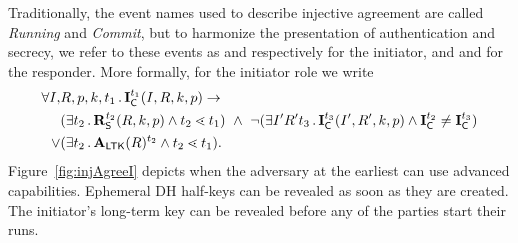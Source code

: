 Traditionally, the event names used to describe injective agreement are called
\emph{Running} and \emph{Commit}, but to harmonize the presentation of
authentication and secrecy, we refer to these events as \mIStart{} and
\mIComplete{} respectively for the initiator, and \mRStart{} and \mRComplete{}
for the responder.
%
More formally, for the initiator role we write
\begin{align*}
    \forall I,& R, p, k, t_1\mLogicDot \mIComplete^{t_1}(I, R, k, p)
    \rightarrow\\
    &(\exists t_2\mLogicDot \mRStart^{t_2}(R, k, p) \land t_2 \lessdot t_1)\ 
    \land\ \neg(\exists I' R' t_3 \mLogicDot \mIComplete^{t_3}(I' , R', k, p)
        \land \mIComplete^{t_2} \not = \mIComplete^{t_3}) \\
    \lor&(\exists t_2\mLogicDot \mRevLTK{R}^{t_2} \land t_2 \lessdot t_1).
\end{align*}
%
Figure~\ref{fig:injAgreeI} depicts when the adversary at the earliest can use
advanced capabilities.
%
Ephemeral DH half-keys can be revealed as soon as they are created.
%
The initiator's long-term key can be revealed before any of the parties start
their runs.
%

